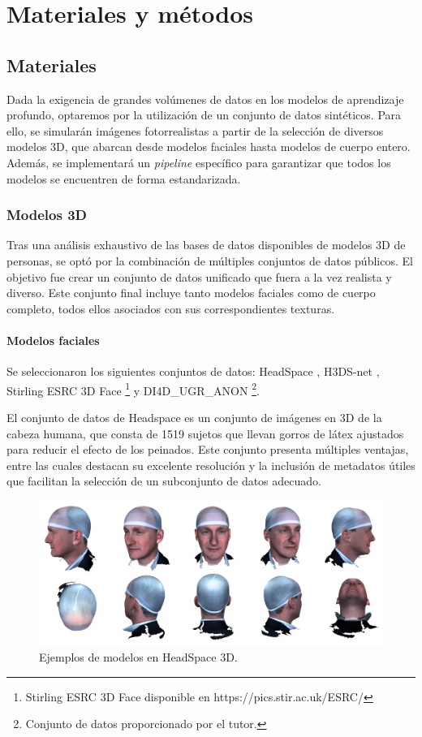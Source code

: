 \chapter{Materiales y métodos}
\thispagestyle{empty}

\section{Materiales}

Dada la exigencia de grandes volúmenes de datos en los modelos de aprendizaje profundo, optaremos por la utilización de un conjunto de datos sintéticos. Para ello, se simularán imágenes fotorrealistas a partir de la selección de diversos modelos 3D, que abarcan desde modelos faciales hasta modelos de cuerpo entero. Además, se implementará un \textit{pipeline} específico para garantizar que todos los modelos se encuentren de forma estandarizada.

\subsection{Modelos 3D}
Tras una análisis exhaustivo de las bases de datos disponibles de modelos 3D de personas, se optó por la combinación de múltiples conjuntos de datos públicos. El objetivo fue crear un conjunto de datos unificado que fuera a la vez realista y diverso. Este conjunto final incluye tanto modelos faciales como de cuerpo completo, todos ellos asociados con sus correspondientes texturas.

\subsubsection{Modelos faciales}
Se seleccionaron los siguientes conjuntos de datos: HeadSpace \cite{60}, H3DS-net \cite{61}, Stirling ESRC 3D Face \footnote{Stirling ESRC 3D Face disponible en https://pics.stir.ac.uk/ESRC/}  y DI4D\_UGR\_ANON \footnote{Conjunto de datos proporcionado por el tutor.}.

El conjunto de datos de Headspace \cite{60} es un conjunto de imágenes en 3D de la cabeza humana, que consta de 1519 sujetos que llevan gorros de látex ajustados para reducir el efecto de los peinados. Este conjunto presenta múltiples ventajas, entre las cuales destacan su excelente resolución y la inclusión de metadatos útiles que facilitan la selección de un subconjunto de datos adecuado.

\begin{figure}[h]
	\centering
	\includegraphics[scale=0.075]{imagenes/cap4/headspace.png}
	\caption[Ejemplos HeadSpace 3D.]{Ejemplos de modelos en HeadSpace 3D.}
	\label{fig17}
\end{figure}

